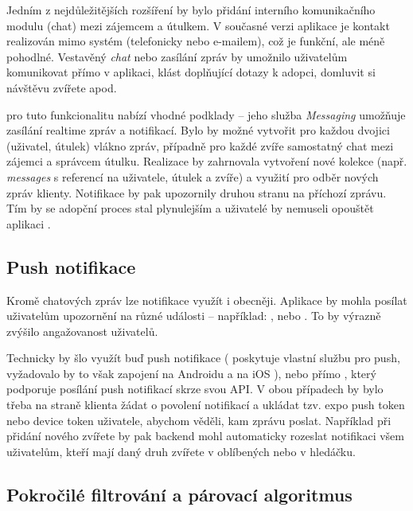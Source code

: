 \documentclass[czech, bp, kiv, he, iso690numb, pdf]{fasthesis}
\begin{document}
    Jedním z nejdůležitějších rozšíření by bylo přidání interního komunikačního modulu (chat) mezi zájemcem a útulkem. V současné verzi aplikace je kontakt realizován mimo systém (telefonicky nebo e-mailem), což je funkční, ale méně pohodlné. Vestavěný \textit{chat} nebo zasílání zpráv by umožnilo uživatelům komunikovat přímo v aplikaci, klást doplňující dotazy k adopci, domluvit si návštěvu zvířete apod.

     pro tuto funkcionalitu nabízí vhodné podklady – jeho služba \textit{Messaging} umožňuje zasílání realtime zpráv a notifikací. Bylo by možné vytvořit pro každou dvojici (uživatel, útulek) vlákno zpráv, případně pro každé zvíře samostatný chat mezi zájemci a správcem útulku. Realizace by zahrnovala vytvoření nové kolekce (např. \textit{messages} s referencí na uživatele, útulek a zvíře) a využití  pro odběr nových zpráv klienty. Notifikace by pak upozornily druhou stranu na příchozí zprávu. Tím by se adopční proces stal plynulejším a uživatelé by nemuseli opouštět aplikaci \cite{appwriteMessaging2025}.

    \subsection*{Push notifikace}

    Kromě chatových zpráv lze notifikace využít i obecněji. Aplikace by mohla posílat uživatelům upozornění na různé události – například: , nebo . To by výrazně zvýšilo angažovanost uživatelů.

    Technicky by šlo využít buď  push notifikace ( poskytuje vlastní službu pro push, vyžadovalo by to však zapojení  na Androidu a  na iOS \cite{expoPush2025}), nebo přímo , který podporuje posílání push notifikací skrze svou API. V obou případech by bylo třeba na straně klienta žádat o povolení notifikací a ukládat tzv. expo push token nebo device token uživatele, abychom věděli, kam zprávu poslat. Například při přidání nového zvířete by pak backend mohl automaticky rozeslat notifikaci všem uživatelům, kteří mají daný druh zvířete v oblíbených nebo v hledáčku.

    \subsection*{Pokročilé filtrování a párovací algoritmus}
\end{document}
